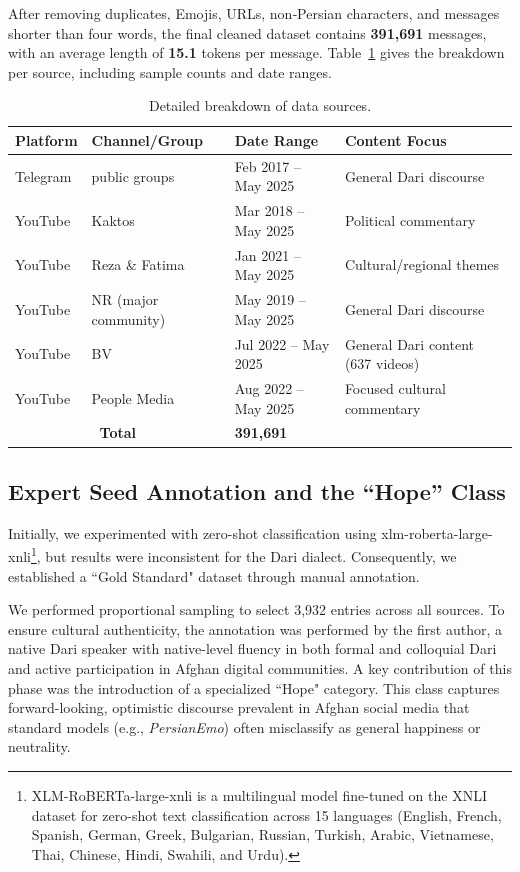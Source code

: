 \documentclass[runningheads]{llncs}
\begin{document}
After removing duplicates, Emojis, URLs, non‑Persian characters, and messages shorter than four words, the final cleaned dataset contains \textbf{391,691} messages, with an average length of \textbf{15.1} tokens per message. Table~\ref{tab:data_sources_detailed} gives the breakdown per source, including sample counts and date ranges.
\begin{table}[H]
\centering
\caption{Detailed breakdown of data sources.}
\label{tab:data_sources_detailed}
\begin{tabular}{@{}p{2.5cm}p{3cm}p{3.5cm}p{3.5cm}@{}}
\toprule
\textbf{Platform} & \textbf{Channel/Group} & \textbf{Date Range} & \textbf{Content Focus} \\
\midrule
Telegram & public groups & Feb 2017 – May 2025 & General Dari discourse \\
YouTube & Kaktos & Mar 2018 – May 2025 & Political commentary \\
YouTube & Reza \& Fatima & Jan 2021 – May 2025 & Cultural/regional themes \\
YouTube & NR (major community) & May 2019 – May 2025 & General Dari discourse \\
YouTube & BV & Jul 2022 – May 2025 & General Dari content (637 videos) \\
YouTube & People Media & Aug 2022 – May 2025 & Focused cultural commentary \\
\midrule
\multicolumn{2}{c}{\textbf{Total}} & \textbf{391,691} & \\
\bottomrule
\end{tabular}
\end{table}

\subsection{Expert Seed Annotation and the ``Hope'' Class}
Initially, we experimented with zero-shot classification using xlm-roberta-large-xnli\footnote{XLM-RoBERTa-large-xnli is a multilingual model fine-tuned on the XNLI dataset for zero-shot text classification across 15 languages (English, French, Spanish, German, Greek, Bulgarian, Russian, Turkish, Arabic, Vietnamese, Thai, Chinese, Hindi, Swahili, and Urdu).}, but results were inconsistent for the Dari dialect. Consequently, we established a ``Gold Standard" dataset through manual annotation. 

We performed proportional sampling to select 3,932 entries across all sources. To ensure cultural authenticity, the annotation was performed by the first author, a native Dari speaker with 
native-level fluency in both formal and colloquial Dari and active 
participation in Afghan digital communities. A key contribution of this phase was the introduction of a specialized ``Hope" category. This class captures forward-looking, optimistic discourse prevalent in Afghan social media that standard models (e.g., \textit{PersianEmo}) often misclassify as general happiness or neutrality.
\end{document}
